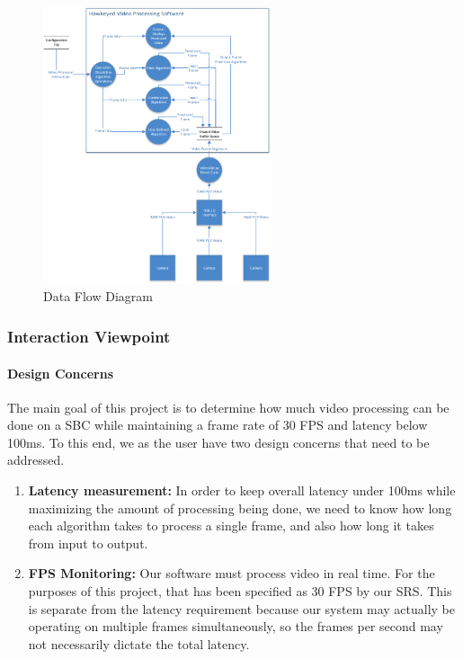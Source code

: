 	\begin{figure}[H] 
		\centering
		\includegraphics[width=0.6\textwidth,natwidth=610,natheight=642]{images/DataFlow_Diagram.png} 
		\caption{Data Flow Diagram} 
		\end{figure}
	
\subsubsection{Interaction Viewpoint}
	\paragraph{Design Concerns}
	The main goal of this project is to determine how much video processing can be done on a SBC while maintaining a frame rate of 30 FPS and latency below 100ms. To this end, we as the user have two design concerns that need to be addressed.\\
	
	\begin{enumerate}[leftmargin=2cm,labelindent=2cm]
	\item \textbf{Latency measurement:}
	In order to keep overall latency under 100ms while maximizing the amount of processing being done, we need to know how long each algorithm 	takes to process a single frame, and also how long it takes from input to output.

	\item \textbf{FPS Monitoring:}
	Our software must process video in real time. For the purposes of this project, that has been specified as 30 FPS by our SRS. This is separate 	from the latency requirement because our system may actually be operating on multiple frames simultaneously, so the frames per second may not 	necessarily dictate the total latency.\\
	\end{enumerate}
	
